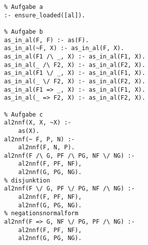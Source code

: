 \documentclass[a4paper,10pt]{article}
\begin{document}
		\begin{verbatim}
		% Aufgabe a
		:- ensure_loaded([al]).
		
		% Aufgabe b
		as_in_al(F, F) :- as(F).
		as_in_al(~F, X) :- as_in_al(F, X).
		as_in_al(F1 /\ _, X) :- as_in_al(F1, X).
		as_in_al(_ /\ F2, X) :- as_in_al(F2, X).
		as_in_al(F1 \/ _, X) :- as_in_al(F1, X).
		as_in_al(_ \/ F2, X) :- as_in_al(F2, X).
		as_in_al(F1 => _, X) :- as_in_al(F1, X).
		as_in_al(_ => F2, X) :- as_in_al(F2, X).
		
		% Aufgabe c
		al2nnf(X, X, ~X) :-
			as(X).
		al2nnf(~ F, P, N) :- 
			al2nnf(F, N, P).
		al2nnf(F /\ G, PF /\ PG, NF \/ NG) :-
			al2nnf(F, PF, NF),
			al2nnf(G, PG, NG).
		% disjunktion
		al2nnf(F \/ G, PF \/ PG, NF /\ NG) :-
			al2nnf(F, PF, NF),
			al2nnf(G, PG, NG).
		% negationsnormalform
		al2nnf(F => G, NF \/ PG, PF /\ NG) :-
			al2nnf(F, PF, NF),
			al2nnf(G, PG, NG).
		\end{verbatim}
\end{document}
